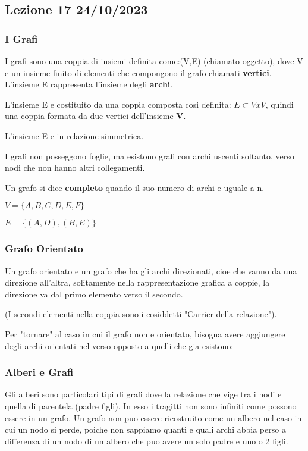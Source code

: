 \subsection{Lezione 17 24/10/2023}

\subsubsection{I Grafi}
I grafi sono una coppia di insiemi definita come:(V,E) (chiamato oggetto), dove V e un insieme finito di elementi che compongono il grafo chiamati \textbf{vertici}. L'insieme E rappresenta l'insieme degli \textbf{archi}.

L'insieme E e costituito da una coppia composta cosi definita: $E \subset V x V$, quindi una coppia formata da due vertici dell'insieme \textbf{V}.

L'insieme E e in relazione simmetrica. 

I  grafi non posseggono foglie, ma esistono grafi con archi uscenti soltanto, verso nodi che non hanno altri collegamenti.

Un grafo si dice \textbf{completo} quando il suo numero di archi e uguale a n.


$V = \{A,B,C,D,E,F\}$

$E = \{(A,D), (B,E)\}$

\subsubsection{Grafo Orientato}
Un grafo orientato e un grafo che ha gli archi direzionati, cioe che vanno da una direzione all'altra, solitamente nella rappresentazione grafica a coppie, la direzione va dal primo elemento verso il secondo.

(I secondi elementi nella coppia sono i cosiddetti "Carrier della relazione").


Per "tornare" al caso in cui il grafo non e orientato, bisogna avere aggiungere degli archi orientati nel verso opposto a quelli che gia esistono:


\subsubsection{Alberi e Grafi}

Gli alberi sono particolari tipi di grafi dove la relazione che vige tra i nodi e quella di parentela (padre figli). In esso i tragitti non sono infiniti come possono essere in un grafo.
Un grafo non puo essere ricostruito come un albero nel caso in cui un nodo si perde, poiche non sappiamo quanti e quali archi abbia perso a differenza di un nodo di un albero che puo avere un solo padre e uno o 2 figli.

